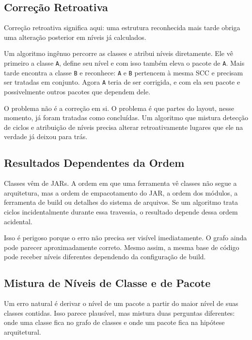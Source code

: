 \documentclass[a4paper,11pt]{article}
\begin{document}
\subsection{Corre\c{c}\~ao Retroativa}

Corre\c{c}\~ao retroativa significa aqui: uma estrutura reconhecida mais tarde
obriga uma altera\c{c}\~ao posterior em n\'iveis j\'a calculados.

Um algoritmo ing\^enuo percorre as classes e atribui n\'iveis diretamente. Ele
v\^e primeiro a classe \texttt{A}, define seu n\'ivel e com isso tamb\'em
eleva o pacote de \texttt{A}. Mais tarde encontra a classe \texttt{B} e
reconhece: \texttt{A} e \texttt{B} pertencem \`a mesma SCC e precisam ser
tratadas em conjunto. Agora \texttt{A} teria de ser corrigida, e com ela seu
pacote e possivelmente outros pacotes que dependem dele.

O problema n\~ao \'e a corre\c{c}\~ao em si. O problema \'e que partes do
layout, nesse momento, j\'a foram tratadas como conclu\'idas. Um algoritmo que
mistura detec\c{c}\~ao de ciclos e atribui\c{c}\~ao de n\'iveis precisa
alterar retroativamente lugares que ele na verdade j\'a deixou para tr\'as.

\subsection{Resultados Dependentes da Ordem}

Classes v\^em de JARs. A ordem em que uma ferramenta v\^e classes n\~ao segue
a arquitetura, mas a ordem de empacotamento do JAR, a ordem dos m\'odulos, a
ferramenta de build ou detalhes do sistema de arquivos. Se um algoritmo trata
ciclos incidentalmente durante essa travessia, o resultado depende dessa ordem
acidental.

Isso \'e perigoso porque o erro n\~ao precisa ser vis\'ivel imediatamente. O
grafo ainda pode parecer aproximadamente correto. Mesmo assim, a mesma base de
c\'odigo pode receber n\'iveis diferentes dependendo da configura\c{c}\~ao de
build.

\subsection{Mistura de N\'iveis de Classe e de Pacote}

Um erro natural \'e derivar o n\'ivel de um pacote a partir do maior n\'ivel de
suas classes contidas. Isso parece plaus\'ivel, mas mistura duas perguntas
diferentes: onde uma classe fica no grafo de classes e onde um pacote fica na
hip\'otese arquitetural.
\end{document}
